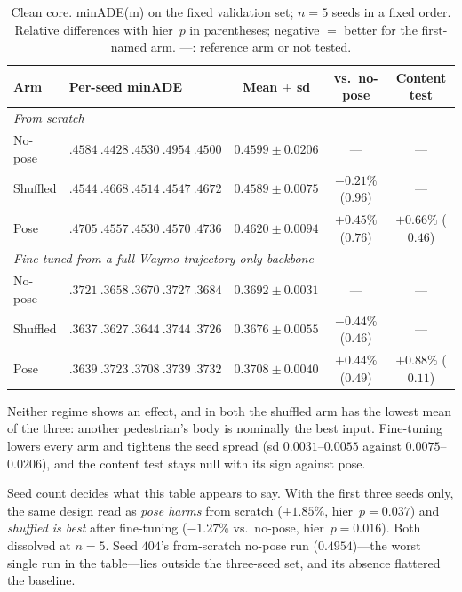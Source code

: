 \documentclass{article} %
\newcommand{\minADE}{minADE\xspace}
\begin{document}
\begin{table}[t]
\caption{Clean core. \minADE (m) on the fixed validation set; $n{=}5$ seeds in a
fixed order. Relative differences with hier~$p$ in parentheses; negative $=$
better for the first-named arm. ---: reference arm or not tested.}
\label{tab:core}
\begin{center}
\footnotesize
\setlength{\tabcolsep}{4pt}
\begin{tabular}{llccc}
\toprule
Arm & Per-seed \minADE & Mean $\pm$ sd & vs.\ no-pose & Content test \\
\midrule
\multicolumn{5}{l}{\emph{From scratch}} \\
No-pose  & $.4584\ .4428\ .4530\ .4954\ .4500$ & $0.4599 \pm 0.0206$ & --- & --- \\
Shuffled & $.4544\ .4668\ .4514\ .4547\ .4672$ & $0.4589 \pm 0.0075$ & $-0.21\%$ ($0.96$) & --- \\
Pose     & $.4705\ .4557\ .4530\ .4570\ .4736$ & $0.4620 \pm 0.0094$ & $+0.45\%$ ($0.76$) & $+0.66\%$ ($0.46$) \\
\midrule
\multicolumn{5}{l}{\emph{Fine-tuned from a full-Waymo trajectory-only backbone}} \\
No-pose  & $.3721\ .3658\ .3670\ .3727\ .3684$ & $0.3692 \pm 0.0031$ & --- & --- \\
Shuffled & $.3637\ .3627\ .3644\ .3744\ .3726$ & $0.3676 \pm 0.0055$ & $-0.44\%$ ($0.46$) & --- \\
Pose     & $.3639\ .3723\ .3708\ .3739\ .3732$ & $0.3708 \pm 0.0040$ & $+0.44\%$ ($0.49$) & $+0.88\%$ ($0.11$) \\
\bottomrule
\end{tabular}
\end{center}
\end{table}

Neither regime shows an effect, and in both the shuffled arm has the lowest mean
of the three: another pedestrian's body is nominally the best input. Fine-tuning
lowers every arm and tightens the seed spread (sd $0.0031$--$0.0055$ against
$0.0075$--$0.0206$), and the content test stays null with its sign against pose.

Seed count decides what this table appears to say. With the first three seeds only,
the same design read as \emph{pose harms} from scratch ($+1.85\%$,
hier~$p{=}0.037$) and \emph{shuffled is best} after fine-tuning ($-1.27\%$ vs.\
no-pose, hier~$p{=}0.016$). Both dissolved at $n{=}5$. Seed $404$'s from-scratch
no-pose run ($0.4954$)---the worst single run in the table---lies outside the
three-seed set, and its absence flattered the baseline.
\end{document}
